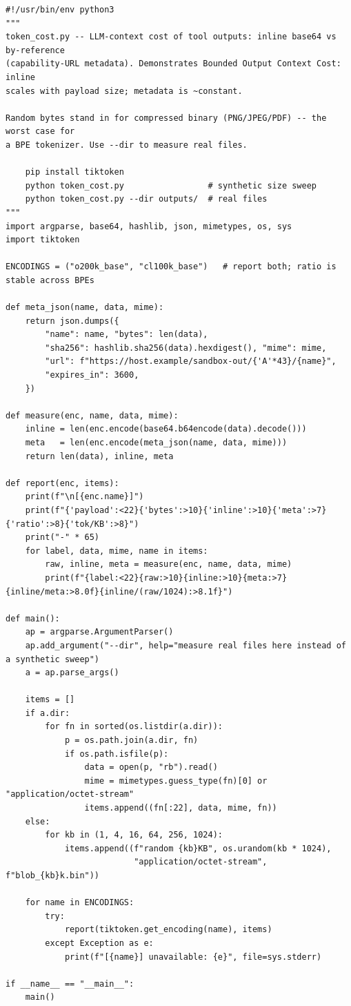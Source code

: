 \documentclass[11pt]{article}
\begin{document}
\begin{lstlisting}[style=py,caption={Measurement harness: inline base64 vs by-reference metadata token cost.},label={lst:harness}]
#!/usr/bin/env python3
"""
token_cost.py -- LLM-context cost of tool outputs: inline base64 vs by-reference
(capability-URL metadata). Demonstrates Bounded Output Context Cost: inline
scales with payload size; metadata is ~constant.

Random bytes stand in for compressed binary (PNG/JPEG/PDF) -- the worst case for
a BPE tokenizer. Use --dir to measure real files.

    pip install tiktoken
    python token_cost.py                 # synthetic size sweep
    python token_cost.py --dir outputs/  # real files
"""
import argparse, base64, hashlib, json, mimetypes, os, sys
import tiktoken

ENCODINGS = ("o200k_base", "cl100k_base")   # report both; ratio is stable across BPEs

def meta_json(name, data, mime):
    return json.dumps({
        "name": name, "bytes": len(data),
        "sha256": hashlib.sha256(data).hexdigest(), "mime": mime,
        "url": f"https://host.example/sandbox-out/{'A'*43}/{name}",
        "expires_in": 3600,
    })

def measure(enc, name, data, mime):
    inline = len(enc.encode(base64.b64encode(data).decode()))
    meta   = len(enc.encode(meta_json(name, data, mime)))
    return len(data), inline, meta

def report(enc, items):
    print(f"\n[{enc.name}]")
    print(f"{'payload':<22}{'bytes':>10}{'inline':>10}{'meta':>7}{'ratio':>8}{'tok/KB':>8}")
    print("-" * 65)
    for label, data, mime, name in items:
        raw, inline, meta = measure(enc, name, data, mime)
        print(f"{label:<22}{raw:>10}{inline:>10}{meta:>7}{inline/meta:>8.0f}{inline/(raw/1024):>8.1f}")

def main():
    ap = argparse.ArgumentParser()
    ap.add_argument("--dir", help="measure real files here instead of a synthetic sweep")
    a = ap.parse_args()

    items = []
    if a.dir:
        for fn in sorted(os.listdir(a.dir)):
            p = os.path.join(a.dir, fn)
            if os.path.isfile(p):
                data = open(p, "rb").read()
                mime = mimetypes.guess_type(fn)[0] or "application/octet-stream"
                items.append((fn[:22], data, mime, fn))
    else:
        for kb in (1, 4, 16, 64, 256, 1024):
            items.append((f"random {kb}KB", os.urandom(kb * 1024),
                          "application/octet-stream", f"blob_{kb}k.bin"))

    for name in ENCODINGS:
        try:
            report(tiktoken.get_encoding(name), items)
        except Exception as e:
            print(f"[{name}] unavailable: {e}", file=sys.stderr)

if __name__ == "__main__":
    main()
\end{lstlisting}
\end{document}
